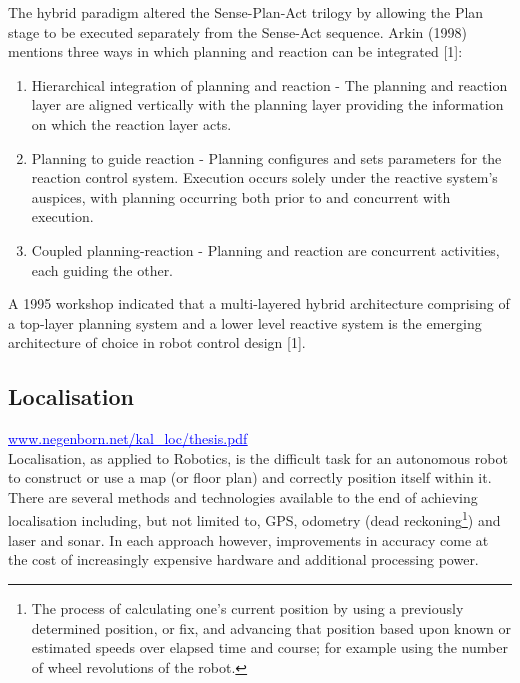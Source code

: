 \documentclass{article}
\begin{document}
The hybrid paradigm altered the Sense-Plan-Act trilogy by allowing the Plan stage to be executed separately from the Sense-Act sequence. Arkin (1998) mentions three ways in which planning and reaction can be integrated [1]:
\begin{enumerate}
\item Hierarchical integration of planning and reaction - The planning and reaction layer are aligned vertically with the planning layer providing the information on which the reaction layer acts.

\item Planning to guide reaction - Planning configures and sets parameters for the reaction control system. Execution occurs solely under the reactive system's auspices, with planning occurring both prior to and concurrent with execution.

\item Coupled planning-reaction - Planning and reaction are concurrent activities, each guiding the other.
\end{enumerate}

A 1995 workshop indicated that a multi-layered hybrid architecture comprising of a top-layer planning system and a lower level reactive system is the emerging architecture of choice in robot control design [1].

	\subsection{Localisation}

	\href{http://www.negenborn.net/kal_loc/thesis.pdf}{\textcolor{blue}{\uline{www.negenborn.net/kal\_loc/thesis.pdf}}} \\
 
	Localisation, as applied to Robotics, is the difficult task for an autonomous robot to construct or use a map (or floor plan) and correctly position itself within it. There are several methods and technologies available to the end of achieving localisation including, but not limited to, GPS, odometry (dead reckoning\footnote{The process of calculating one's current position by using a previously determined position, or fix, and advancing that position based upon known or estimated speeds over elapsed time and course; for example using the number of wheel revolutions of the robot.}) and laser and sonar. In each approach however, improvements in accuracy come at the cost of increasingly expensive hardware and  additional processing power. 
\end{document}
